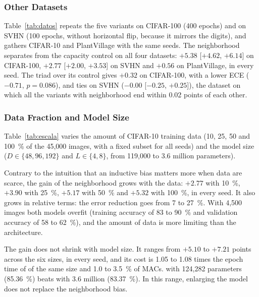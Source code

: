 \subsubsection{Other Datasets}
\label{sec:res-datos}
Table~\ref{tab:datos} repeats the five variants on CIFAR-100 (400 epochs) and on SVHN \cite{netzer2011reading} (100 epochs, without horizontal flip, because it mirrors the digits), and gathers CIFAR-10 and PlantVillage with the same seeds. The neighborhood separates from the capacity control on all four datasets: $+5.38$ [$+4.62$, $+6.14$] on CIFAR-100, $+2.77$ [$+2.00$, $+3.53$] on SVHN and $+0.56$ on PlantVillage, in every seed. The triad over its control gives $+0.32$ on CIFAR-100, with a lower ECE ($-0.71$, $p=0.086$), and ties on SVHN ($-0.00$ [$-0.25$, $+0.25$]), the dataset on which all the variants with neighborhood end within 0.02 points of each other.



\subsubsection{Data Fraction and Model Size}
\label{sec:res-escala}
Table~\ref{tab:escala} varies the amount of CIFAR-10 training data (10, 25, 50 and 100~\% of the 45,000 images, with a fixed subset for all seeds) and the model size ($D\in\{48,96,192\}$ and $L\in\{4,8\}$, from 119,000 to 3.6 million parameters).

Contrary to the intuition that an inductive bias matters more when data are scarce, the gain of the neighborhood grows with the data: $+2.77$ with 10~\%, $+3.90$ with 25~\%, $+5.17$ with 50~\% and $+5.32$ with 100~\%, in every seed. It also grows in relative terms: the error reduction goes from 7 to 27~\%. With 4,500 images both models overfit (training accuracy of 83 to 90~\% and validation accuracy of 58 to 62~\%), and the amount of data is more limiting than the architecture.

The gain does not shrink with model size. It ranges from $+5.10$ to $+7.21$ points across the six sizes, in every seed, and its cost is 1.05 to 1.08 times the epoch time of  of the same size and 1.0 to 3.5~\% of MACs.  with 124,282 parameters (85.36~\%) beats  with 3.6 million (83.37~\%). In this range, enlarging the model does not replace the neighborhood bias.



